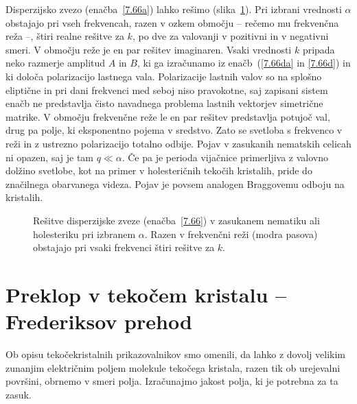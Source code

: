 \begin{remark}
Disperzijsko zvezo (enačba~\ref{7.66a}) 
lahko rešimo (slika~\ref{gap}). Pri izbrani vrednosti $\alpha$ 
obstajajo pri vseh frekvencah, razen v ozkem območju -- rečemo mu frekvenčna reža --,
štiri realne rešitve za $k$, po dve za valovanji v pozitivni in v negativni smeri.
V območju reže je en par rešitev imaginaren. Vsaki vrednosti $k$
pripada neko razmerje amplitud $A$ in $B$, ki ga izračunamo
iz enačb~(\ref{7.66da} in \ref{7.66d}) in ki določa polarizacijo lastnega vala. Polarizacije
lastnih valov so na splošno eliptične in pri dani frekvenci med
seboj niso pravokotne, saj zapisani sistem enačb ne predstavlja čisto 
navadnega problema lastnih vektorjev simetrične matrike. 
V območju frekvenčne reže le en par rešitev predstavlja
potujoč val, drug pa polje, ki eksponentno pojema v sredstvo. Zato
se svetloba s frekvenco v reži in z ustrezno polarizacijo totalno odbije. Pojav v zasukanih
nematskih celicah ni opazen, saj je tam $q \ll \alpha$. Če pa je perioda vijačnice
primerljiva z valovno dolžino svetlobe, kot na primer v holesteričnih
tekočih kristalih, pride do značilnega obarvanega videza. Pojav
je povsem analogen Braggovemu odboju na kristalih.
\begin{figure}[ht]
\centering
\def\svgwidth{80truemm} 

\caption{Rešitve disperzijske zveze (enačba~\ref{7.66}) v zasukanem nematiku
ali holesteriku pri izbranem $\alpha$. Razen v frekvenčni reži (modra pasova) obstajajo
pri vsaki frekvenci štiri rešitve za $k$.}
\label{gap}
\end{figure}
\end{remark}

\section{Preklop v tekočem kristalu -- Frederiksov prehod}
Ob opisu tekočekristalnih prikazovalnikov smo omenili, da lahko z dovolj velikim 
zunanjim električnim poljem molekule tekočega kristala, razen tik ob urejevalni površini,
obrnemo v smeri polja. Izračunajmo jakost polja, ki je potrebna za ta zasuk. 

